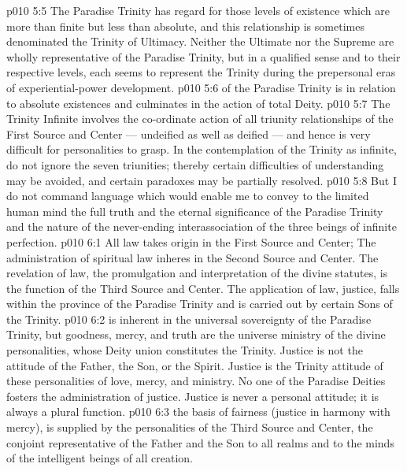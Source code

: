 \vs p010 5:5 \pc {}\bibnobreakspace {} The Paradise Trinity has regard for those levels of existence which are more than finite but less than absolute, and this relationship is sometimes denominated the Trinity of Ultimacy. Neither the Ultimate nor the Supreme are wholly representative of the Paradise Trinity, but in a qualified sense and to their respective levels, each seems to represent the Trinity during the prepersonal eras of experiential\hyp{}power development.
\vs p010 5:6 \pc {}\bibnobreakspace {} of the Paradise Trinity is in relation to absolute existences and culminates in the action of total Deity.
\vs p010 5:7 \pc The Trinity Infinite involves the co\hyp{}ordinate action of all triunity relationships of the First Source and Center --- undeified as well as deified --- and hence is very difficult for personalities to grasp. In the contemplation of the Trinity as infinite, do not ignore the seven triunities; thereby certain difficulties of understanding may be avoided, and certain paradoxes may be partially resolved.
\vs p010 5:8 \pc But I do not command language which would enable me to convey to the limited human mind the full truth and the eternal significance of the Paradise Trinity and the nature of the never\hyp{}ending interassociation of the three beings of infinite perfection.
\vs p010 6:1 All law takes origin in the First Source and Center;  The administration of spiritual law inheres in the Second Source and Center. The revelation of law, the promulgation and interpretation of the divine statutes, is the function of the Third Source and Center. The application of law, justice, falls within the province of the Paradise Trinity and is carried out by certain Sons of the Trinity.
\vs p010 6:2 \pc {} is inherent in the universal sovereignty of the Paradise Trinity, but goodness, mercy, and truth are the universe ministry of the divine personalities, whose Deity union constitutes the Trinity. Justice is not the attitude of the Father, the Son, or the Spirit. Justice is the Trinity attitude of these personalities of love, mercy, and ministry. No one of the Paradise Deities fosters the administration of justice. Justice is never a personal attitude; it is always a plural function.
\vs p010 6:3 \pc {} the basis of fairness (justice in harmony with mercy), is supplied by the personalities of the Third Source and Center, the conjoint representative of the Father and the Son to all realms and to the minds of the intelligent beings of all creation.
